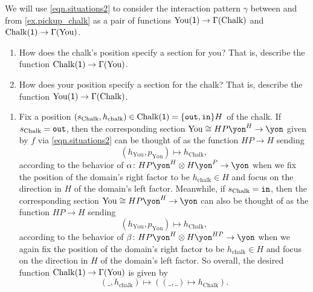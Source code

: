 \documentclass[Book-Poly]{subfiles}
\begin{document}

\begin{exercise}
We will use \eqref{eqn.situations2} to consider the interaction pattern $\gamma$ between  and  from \cref{ex.pickup_chalk} as a pair of functions $\operatorname{You}(\textsf{1})\to\Gamma(\text{Chalk})$ and $\operatorname{Chalk}(\textsf{1})\to\Gamma(\text{You})$.
\begin{enumerate}
	\item How does the chalk's position specify a section for you? That is, describe the function $\operatorname{Chalk}(\textsf{1})\to\Gamma(\text{You})$.
	\item How does your position specify a section for the chalk? That is, describe the function $\operatorname{You}(\textsf{1})\to\Gamma(\text{Chalk})$.
\qedhere
\end{enumerate}
\begin{solution}
\begin{enumerate}
    \item Fix a position $(s_\text{Chalk}, h_\text{chalk})\in\operatorname{Chalk}(\textsf{1})=\{\texttt{out},\texttt{in}\}H$ of the chalk.
    If $s_\text{Chalk}=\texttt{out}$, then the corresponding section $\text{You}\iso HP\yon^H\to\yon$ given by $f$ via \eqref{eqn.situations2} can be thought of as the function $HP\to H$ sending
    \[
        (h_\text{You},p_\text{You})\mapsto h_\text{Chalk},
    \]
    according to the behavior of $\alpha\colon HP\yon^H\otimes H\yon^P\to\yon$ when we fix the position of the domain's right factor to be $h_\text{chalk}\in H$ and focus on the direction in $H$ of the domain's left factor.
    Meanwhile, if $s_\text{Chalk}=\texttt{in}$, then the corresponding section $\text{You}\iso HP\yon^H\to\yon$ can also be thought of as the function $HP\to H$ sending
    \[
        (h_\text{You},p_\text{You})\mapsto h_\text{Chalk},
    \]
    according to the behavior of $\beta\colon HP\yon^H\otimes H\yon^{HP}\to\yon$ when we again fix the position of the domain's right factor to be $h_\text{chalk}\in H$ and focus on the direction in $H$ of the domain's left factor.
    So overall, the desired function $\operatorname{Chalk}(\textsf{1})\to\Gamma(\text{You})$ is given by
    \[
        (\_,h_\text{chalk})\mapsto((\_,\_)\mapsto h_\text{Chalk}).
    \]


\end{enumerate}
\end{solution}
\end{exercise}
\end{document}

